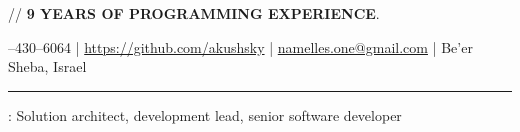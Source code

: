 \documentclass[11pt]{article}
\newif\ifdetailed
\begin{document}
%
{\small{// {\textbf{9 YEARS OF PROGRAMMING EXPERIENCE}}. }}

\vspace{0.5em}

--430--6064    |    \url{https://github.com/akushsky}   |   \href{mailto:namelles.one@gmail.com}{namelles.one@gmail.com}  |  Be’er Sheba, Israel  \ifdetailed | Sivan 11, 5748 \fi

\vspace{0.5em}

\hrule

\vspace{1.5em}

\ifdetailed
\noindent {\textbf{CAREER OBJECTIVE}}: To gain \textbf{international experience} in IT related role (solution architect, senior software developer, development lead). Preferably working with highload systems, big data and distributed software.
\else
{}: Solution architect, development lead, senior software developer
\fi

\vspace{1em}
\end{document}
